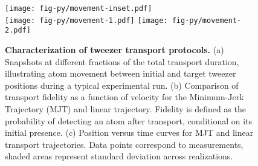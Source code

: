 
\begin{figure}[h]
    \centering
    \texttt{[image: fig-py/movement-inset.pdf]} \\
    \texttt{[image: fig-py/movement-1.pdf]}
    \hspace{1cm}
    \texttt{[image: fig-py/movement-2.pdf]}
    \caption{
    \textbf{Characterization of tweezer transport protocols.}
    (a) Snapshots at different fractions of the total transport duration, illustrating atom movement between initial and target tweezer positions during a typical experimental run.
    (b) Comparison of transport fidelity as a function of velocity for the Minimum-Jerk Trajectory (MJT) and linear trajectory. Fidelity is defined as the probability of detecting an atom after transport, conditional on its initial presence.
    (c) Position versus time curves for MJT and linear transport trajectories.
    Data points correspond to measurements, shaded areas represent standard deviation across realizations.
    }
    \label{fig:movement}
\end{figure}